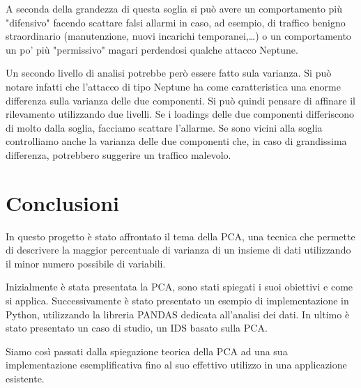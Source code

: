\documentclass[12pt]{article}
\newcommand{\sectionline}{
	\begin{center}
		\resizebox{0.5\linewidth}{1ex}{
			\begin{tikzpicture}
			\node  (C) at (0,0) {};
			\node (D) at (9,0) {};
			\path (C) to [ornament=83] (D);
			\end{tikzpicture}
		}
	\end{center}
}
\begin{document}
			A seconda della grandezza di questa soglia si può avere un comportamento più "difensivo" facendo scattare falsi allarmi in caso, ad esempio, di traffico benigno straordinario (manutenzione, nuovi incarichi temporanei,\dots ) o un comportamento un po' più "permissivo" magari perdendosi qualche attacco Neptune.
			
			Un secondo livello di analisi potrebbe però essere fatto sula varianza. Si può notare infatti che l'attacco di tipo Neptune ha come caratteristica una enorme differenza sulla varianza delle due componenti. Si può quindi pensare di affinare il rilevamento utilizzando due livelli. Se i loadings delle due componenti differiscono di molto dalla soglia, facciamo scattare l'allarme. Se sono vicini alla soglia controlliamo anche la varianza delle due componenti che, in caso di grandissima differenza, potrebbero suggerire un traffico malevolo.

	\sectionline
			
\section{Conclusioni}
	In questo progetto è stato affrontato il tema della PCA, una tecnica che permette di descrivere la maggior percentuale di varianza di un insieme di dati utilizzando il minor numero possibile di variabili.
	
	Inizialmente è stata presentata la PCA, sono stati spiegati i suoi obiettivi e come si applica. Successivamente è stato presentato un esempio di implementazione in Python, utilizzando la libreria PANDAS dedicata all'analisi dei dati. In ultimo è stato presentato un caso di studio, un IDS basato sulla PCA.
	
	Siamo così passati dalla spiegazione teorica della PCA ad una sua implementazione esemplificativa fino al suo effettivo utilizzo in una applicazione esistente.



\end{document}
